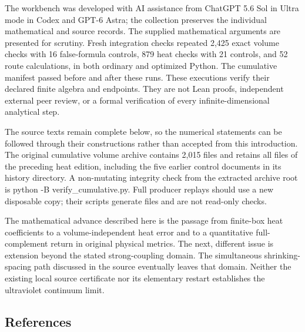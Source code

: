 \documentclass[11pt,a4paper]{article}
\renewcommand{\[}{\begingroup\small\originaldisplaystart}
\renewcommand{\]}{\originaldisplayend\endgroup}
\begin{document}
The workbench was developed with AI assistance from ChatGPT 5.6 Sol in
Ultra mode in Codex and GPT-6 Astra; the collection preserves the
individual mathematical and source records. The supplied mathematical
arguments are presented for scrutiny. Fresh integration checks repeated
2,425 exact volume checks with 16 false-formula controls, 879 heat
checks with 21 controls, and 52 route calculations, in both ordinary and
optimized Python. The cumulative manifest passed before and after these
runs. These executions verify their declared finite algebra and
endpoints. They are not Lean proofs, independent external peer review,
or a formal verification of every infinite-dimensional analytical step.

The source texts remain complete below, so the numerical statements can
be followed through their constructions rather than accepted from this
introduction. The original cumulative volume archive contains 2,015
files and retains all files of the preceding heat edition, including the
five earlier control documents in its history directory. A non-mutating
integrity check from the extracted archive root is
{\ttfamily p\allowbreak{}y\allowbreak{}t\allowbreak{}h\allowbreak{}o\allowbreak{}n\allowbreak{} \allowbreak{}-\allowbreak{}B\allowbreak{} \allowbreak{}v\allowbreak{}e\allowbreak{}r\allowbreak{}i\allowbreak{}f\allowbreak{}y\allowbreak{}\_\allowbreak{}c\allowbreak{}u\allowbreak{}m\allowbreak{}u\allowbreak{}l\allowbreak{}a\allowbreak{}t\allowbreak{}i\allowbreak{}v\allowbreak{}e\allowbreak{}.\allowbreak{}p\allowbreak{}y\allowbreak{}}.
Full producer replays should use a new disposable copy; their scripts
generate files and are not read-only checks.

The mathematical advance described here is the passage from finite-box
heat coefficients to a volume-independent heat error and to a
quantitative full-complement return in original physical metrics. The
next, different issue is extension beyond the stated strong-coupling
domain. The simultaneous shrinking-spacing path discussed in the source
eventually leaves that domain. Neither the existing local source
certificate nor its elementary restart establishes the ultraviolet
continuum limit.

\subsection{References}\label{references}
\end{document}
